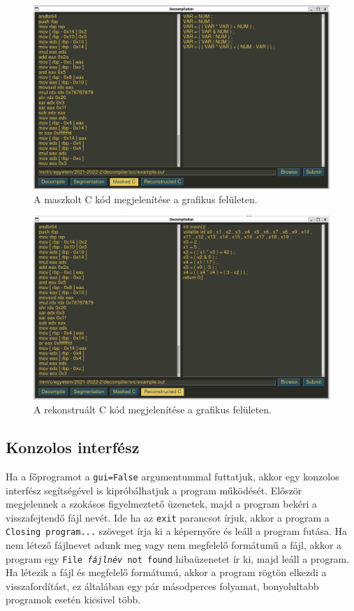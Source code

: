 \begin{figure}[H]
	\centering
	\includegraphics[width=1.0\textwidth]{images/masked_c.png}
	\caption{A maszkolt C kód megjelenítése a grafikus felületen.}
	\label{fig:masked_c}
\end{figure}

\begin{figure}[H]
	\centering
	\includegraphics[width=1.0\textwidth]{images/reconstructed_c.png}
	\caption{A rekonstruált C kód megjelenítése a grafikus felületen.}
	\label{fig:reconstructed_c}
\end{figure}

\subsection{Konzolos interfész}
Ha a főprogramot a \texttt{\-\-gui=False} argumentummal futtatjuk, akkor egy
konzolos interfész segítségével is kipróbálhatjuk a program működését. Először
megjelennek a szokásos figyelmeztető üzenetek, majd a program bekéri
a visszafejtendő fájl nevét. Ide ha az \texttt{exit} parancsot írjuk, akkor
a program a \texttt{Closing program...} szöveget írja ki a képernyőre és
leáll a program futása. Ha nem létező fájlnevet adunk meg vagy nem megfelelő
formátumű a fájl, akkor a program egy
\texttt{File \textit{fájlnév} not found} hibaüzenetet ír ki, majd leáll a program.
Ha létezik a fájl és megfelelő formátumú,
akkor a program rögtön elkezdi a visszafordítást, ez általában egy pár
másodperces folyamat, bonyolultabb programok esetén kicsivel több.

